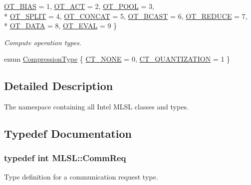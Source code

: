 \begin{DoxyCompactItemize}
\hyperlink{namespaceMLSL_a1366e5621278eafc7ecb03de012824bfa49a50543b1b277ebfac7e22f02608ad2}{O\-T\-\_\-\-B\-I\-A\-S} = 1, 
\hyperlink{namespaceMLSL_a1366e5621278eafc7ecb03de012824bfa7eac245be19cf57e6395510671ebba1a}{O\-T\-\_\-\-A\-C\-T} = 2, 
\hyperlink{namespaceMLSL_a1366e5621278eafc7ecb03de012824bfa6c34e19d18d2aca59c17031314d07208}{O\-T\-\_\-\-P\-O\-O\-L} = 3, 
\\*
\hyperlink{namespaceMLSL_a1366e5621278eafc7ecb03de012824bfa246415eb6cf586ba7e9ea582bb514972}{O\-T\-\_\-\-S\-P\-L\-I\-T} = 4, 
\hyperlink{namespaceMLSL_a1366e5621278eafc7ecb03de012824bfa07a4c6f2426bda90f3885a9e702ed9bc}{O\-T\-\_\-\-C\-O\-N\-C\-A\-T} = 5, 
\hyperlink{namespaceMLSL_a1366e5621278eafc7ecb03de012824bfafdf3fd4cbd9bc9c8da2dc189c49290fa}{O\-T\-\_\-\-B\-C\-A\-S\-T} = 6, 
\hyperlink{namespaceMLSL_a1366e5621278eafc7ecb03de012824bfa9558b22712b606975ce648e1235ad723}{O\-T\-\_\-\-R\-E\-D\-U\-C\-E} = 7, 
\\*
\hyperlink{namespaceMLSL_a1366e5621278eafc7ecb03de012824bfa731eb8ebe65dbc30a5b45f2060c96843}{O\-T\-\_\-\-D\-A\-T\-A} = 8, 
\hyperlink{namespaceMLSL_a1366e5621278eafc7ecb03de012824bfa0fe51fe8337683217b9523cc0ce8b31c}{O\-T\-\_\-\-E\-V\-A\-L} = 9
 \}
\begin{DoxyCompactList}\small\item\em Compute operation types. \end{DoxyCompactList}\item 
enum \hyperlink{namespaceMLSL_a68b033a19889eaa288c1d10b85d23ea2}{Compression\-Type} \{ \hyperlink{namespaceMLSL_a68b033a19889eaa288c1d10b85d23ea2aff711dbf9b304ee795e007e5e667cd52}{C\-T\-\_\-\-N\-O\-N\-E} = 0, 
\hyperlink{namespaceMLSL_a68b033a19889eaa288c1d10b85d23ea2a387a43f9648f4692e3d939b34082c395}{C\-T\-\_\-\-Q\-U\-A\-N\-T\-I\-Z\-A\-T\-I\-O\-N} = 1
 \}
\end{DoxyCompactItemize}


\subsection{Detailed Description}
The namespace containing all Intel M\-L\-S\-L classes and types. 

\subsection{Typedef Documentation}
\hypertarget{namespaceMLSL_aaf6e40eb1d3e48bb109f529d625e4087}{
\subsubsection[{Comm\-Req}]{\setlength{\rightskip}{0pt plus 5cm}typedef int {\bf M\-L\-S\-L\-::\-Comm\-Req}}}\label{namespaceMLSL_aaf6e40eb1d3e48bb109f529d625e4087}
Type definition for a communication request type. 

